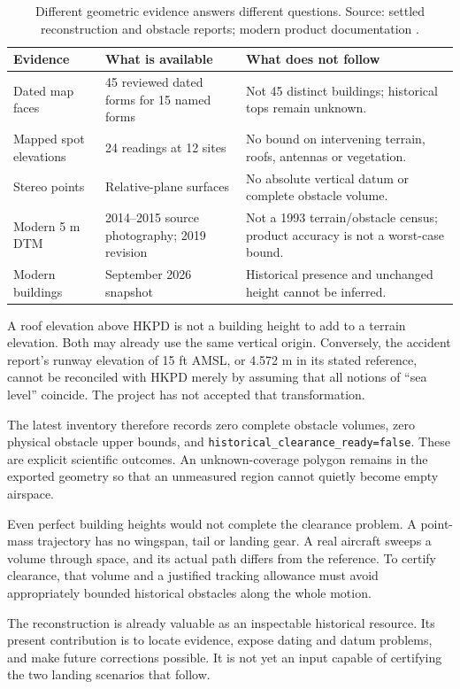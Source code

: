 \begin{table}[H]\small
\caption{Different geometric evidence answers different questions. Source: settled reconstruction and obstacle reports; modern product documentation \citep{dtm,buildings}.}
\begin{tabularx}{\textwidth}{@{}p{}p{}X@{}}\toprule
Evidence & What is available & What does not follow\\\midrule
Dated map faces & 45 reviewed dated forms for 15 named forms & Not 45 distinct buildings; historical tops remain unknown.\\
Mapped spot elevations & 24 readings at 12 sites & No bound on intervening terrain, roofs, antennas or vegetation.\\
Stereo points & Relative-plane surfaces & No absolute vertical datum or complete obstacle volume.\\
Modern 5 m DTM & 2014--2015 source photography; 2019 revision & Not a 1993 terrain/obstacle census; product accuracy is not a worst-case bound.\\
Modern buildings & September 2026 snapshot & Historical presence and unchanged height cannot be inferred.\\\bottomrule
\end{tabularx}\end{table}

A roof elevation above HKPD is not a building height to add to a terrain elevation. Both may already use the same vertical origin. Conversely, the accident report's runway elevation of 15 ft AMSL, or 4.572 m in its stated reference, cannot be reconciled with HKPD merely by assuming that all notions of ``sea level'' coincide. The project has not accepted that transformation.

The latest inventory therefore records zero complete obstacle volumes, zero physical obstacle upper bounds, and \texttt{historical\_\allowbreak clearance\_\allowbreak ready=false}. These are explicit scientific outcomes. An unknown-coverage polygon remains in the exported geometry so that an unmeasured region cannot quietly become empty airspace.

Even perfect building heights would not complete the clearance problem. A point-mass trajectory has no wingspan, tail or landing gear. A real aircraft sweeps a volume through space, and its actual path differs from the reference. To certify clearance, that volume and a justified tracking allowance must avoid appropriately bounded historical obstacles along the whole motion.

The reconstruction is already valuable as an inspectable historical resource. Its present contribution is to locate evidence, expose dating and datum problems, and make future corrections possible. It is not yet an input capable of certifying the two landing scenarios that follow.
\par\medskip
